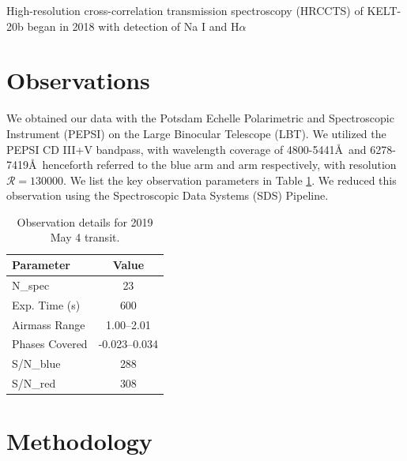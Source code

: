 \documentclass[twocolumn]{aastex631}
\begin{document}
    High-resolution cross-correlation transmission spectroscopy (HRCCTS) of KELT-20b began in 2018 with detection of Na I and H$\alpha$ \citep{CasasayasBarris2018}


\section{Observations} \label{sec:Observations}
    We obtained our data with the Potsdam Echelle Polarimetric and Spectroscopic Instrument (PEPSI)\citep{Strassmeier2015} on the Large Binocular Telescope (LBT). We utilized the PEPSI CD III+V bandpass, with wavelength coverage of 4800-5441\AA\ and 6278-7419\AA\, henceforth referred to the blue arm and arm respectively, with resolution ${\mathcal{R} = 130000}$. We list the key observation parameters in Table \ref{tab:observation_details}.  %
    We reduced this observation using the Spectroscopic Data Systems (SDS) Pipeline.

    \begin{table}[ht]
    \centering
    \begin{tabular}{lc}
    \hline
    \textbf{Parameter} & \textbf{Value} \\
    \hline
    N_{spec} & 23 \\
    Exp. Time (s) & 600 \\
    Airmass Range & 1.00–2.01 \\
    Phases Covered & -0.023–0.034 \\
    S/N_{blue} & 288 \\
    S/N_{red} & 308 \\
    \hline
    \end{tabular}
    \caption{Observation details for 2019 May 4 transit.}
    \label{tab:observation_details}
    \end{table}
    

     
\section{Methodology} \label{sec:Methodology}
\end{document}
